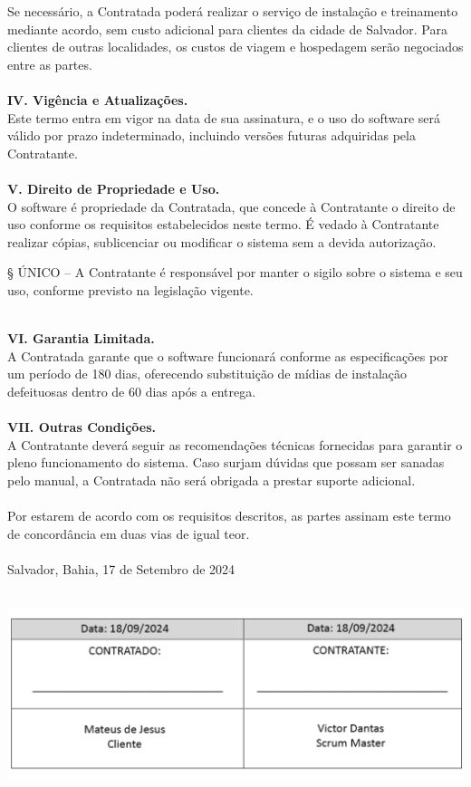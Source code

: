 Se necessário, a Contratada poderá realizar o serviço de instalação e treinamento mediante acordo, sem custo adicional para clientes da cidade de Salvador. Para clientes de outras localidades, os custos de viagem e hospedagem serão negociados entre as partes.\\\\


\textbf{IV. Vigência e Atualizações.}\\
Este termo entra em vigor na data de sua assinatura, e o uso do software será válido por prazo indeterminado, incluindo versões futuras adquiridas pela Contratante.\\\\


\textbf{V. Direito de Propriedade e Uso.}\\
O software é propriedade da Contratada, que concede à Contratante o direito de uso conforme os requisitos estabelecidos neste termo. É vedado à Contratante realizar cópias, sublicenciar ou modificar o sistema sem a devida autorização.\\

\begingroup

    \leftskip 20pt
    \rightskip 20pt
    
    § ÚNICO – A Contratante é responsável por manter o sigilo sobre o sistema e seu uso, conforme previsto na legislação vigente.\\\\

\endgroup

\textbf{VI. Garantia Limitada.}\\
A Contratada garante que o software funcionará conforme as especificações por um período de 180 dias, oferecendo substituição de mídias de instalação defeituosas dentro de 60 dias após a entrega.\\\\


\textbf{VII. Outras Condições.}\\
A Contratante deverá seguir as recomendações técnicas fornecidas para garantir o pleno funcionamento do sistema. Caso surjam dúvidas que possam ser sanadas pelo manual, a Contratada não será obrigada a prestar suporte adicional.\\\\

Por estarem de acordo com os requisitos descritos, as partes assinam este termo de concordância em duas vias de igual teor.\\\\

Salvador, Bahia, 17 de Setembro de 2024\\\\

\endgroup

\begin{center}
    \includegraphics[width=1\textwidth]{PDFs/Assinatura.pdf} 
\end{center}
